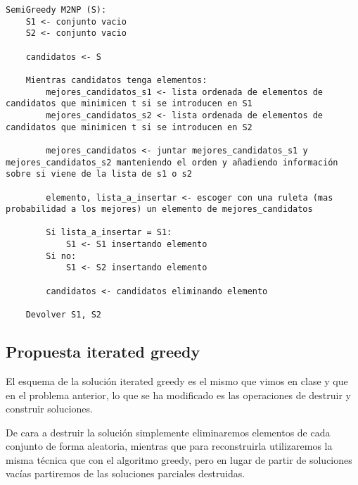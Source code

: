 \begin{lstlisting}
SemiGreedy M2NP (S):
	S1 <- conjunto vacio
	S2 <- conjunto vacio

	candidatos <- S

	Mientras candidatos tenga elementos:
		mejores_candidatos_s1 <- lista ordenada de elementos de candidatos que minimicen t si se introducen en S1
		mejores_candidatos_s2 <- lista ordenada de elementos de candidatos que minimicen t si se introducen en S2

		mejores_candidatos <- juntar mejores_candidatos_s1 y mejores_candidatos_s2 manteniendo el orden y añadiendo información sobre si viene de la lista de s1 o s2

		elemento, lista_a_insertar <- escoger con una ruleta (mas probabilidad a los mejores) un elemento de mejores_candidatos

		Si lista_a_insertar = S1:
			S1 <- S1 insertando elemento
		Si no:
			S1 <- S2 insertando elemento

		candidatos <- candidatos eliminando elemento

	Devolver S1, S2
\end{lstlisting}

\subsection{Propuesta iterated greedy}

El esquema de la solución iterated greedy es el mismo que vimos en clase y que en el problema anterior, lo que se ha modificado es las operaciones de destruir y construir soluciones.

De cara a destruir la solución simplemente eliminaremos elementos de cada conjunto de forma aleatoria, mientras que para reconstruirla utilizaremos la misma técnica que con el algoritmo greedy, pero en lugar de partir de soluciones vacías partiremos de las soluciones parciales destruidas.

